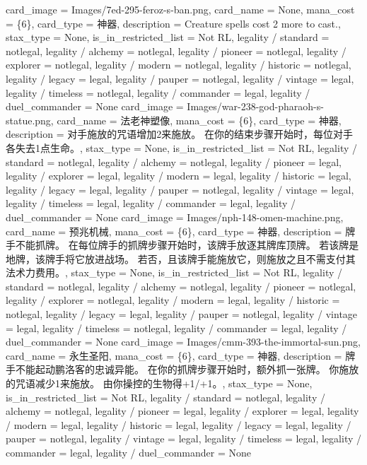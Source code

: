\documentclass[lang = cn, color = black, 10pt]{AllThatStax}
\begin{document}
\card
{
	card_image = Images/7ed-295-feroz-s-ban.png,
	card_name = None,
	mana_cost = \{6\},
	card_type = 神器,
	description = Creature spells cost {2} more to cast.,
	stax_type = None,
	is_in_restricted_list = Not RL,
	legality / standard = notlegal,
	legality / alchemy = notlegal,
	legality / pioneer = notlegal,
	legality / explorer = notlegal,
	legality / modern = notlegal,
	legality / historic = notlegal,
	legality / legacy = legal,
	legality / pauper = notlegal,
	legality / vintage = legal,
	legality / timeless = notlegal,
	legality / commander = legal,
	legality / duel_commander = None
}
\card
{
	card_image = Images/war-238-god-pharaoh-s-statue.png,
	card_name = 法老神塑像,
	mana_cost = \{6\},
	card_type = 神器,
	description = 对手施放的咒语增加{2}来施放。
	在你的结束步骤开始时，每位对手各失去1点生命。,
	stax_type = None,
	is_in_restricted_list = Not RL,
	legality / standard = notlegal,
	legality / alchemy = notlegal,
	legality / pioneer = legal,
	legality / explorer = legal,
	legality / modern = legal,
	legality / historic = legal,
	legality / legacy = legal,
	legality / pauper = notlegal,
	legality / vintage = legal,
	legality / timeless = legal,
	legality / commander = legal,
	legality / duel_commander = None
}
\card
{
	card_image = Images/nph-148-omen-machine.png,
	card_name = 预兆机械,
	mana_cost = \{6\},
	card_type = 神器,
	description = 牌手不能抓牌。
	在每位牌手的抓牌步骤开始时，该牌手放逐其牌库顶牌。 若该牌是地牌，该牌手将它放进战场。 若否，且该牌手能施放它，则施放之且不需支付其法术力费用。,
	stax_type = None,
	is_in_restricted_list = Not RL,
	legality / standard = notlegal,
	legality / alchemy = notlegal,
	legality / pioneer = notlegal,
	legality / explorer = notlegal,
	legality / modern = legal,
	legality / historic = notlegal,
	legality / legacy = legal,
	legality / pauper = notlegal,
	legality / vintage = legal,
	legality / timeless = notlegal,
	legality / commander = legal,
	legality / duel_commander = None
}
\card
{
	card_image = Images/cmm-393-the-immortal-sun.png,
	card_name = 永生圣阳,
	mana_cost = \{6\},
	card_type = 神器,
	description = 牌手不能起动鹏洛客的忠诚异能。
	在你的抓牌步骤开始时，额外抓一张牌。
	你施放的咒语减少{1}来施放。
	由你操控的生物得+1/+1。,
	stax_type = None,
	is_in_restricted_list = Not RL,
	legality / standard = notlegal,
	legality / alchemy = notlegal,
	legality / pioneer = legal,
	legality / explorer = legal,
	legality / modern = legal,
	legality / historic = legal,
	legality / legacy = legal,
	legality / pauper = notlegal,
	legality / vintage = legal,
	legality / timeless = legal,
	legality / commander = legal,
	legality / duel_commander = None
}
\end{document}
